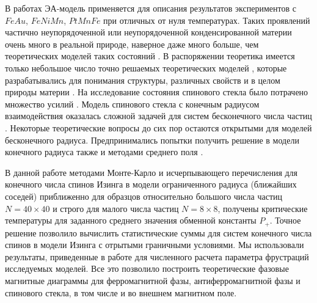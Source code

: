 В работах \cite{Feigelman1985Hierarchical, Murani1977Spin, Deryabin1983Features} ЭА-модель применяется для описания результатов экспериментов с $FeAu$, $FeNiMn$, $PtMnFe$ при отличных от нуля температурах.  Таких проявлений частично неупорядоченной или неупорядоченной конденсированной материи очень много в реальной природе, наверное даже много больше, чем теоретических моделей таких состояний \cite{ziman1979models}. В распоряжении теоретика имеется только небольшое число точно решаемых теоретических моделей \cite{baxter2016exactly}, которые разрабатывались для понимания структуры, различных свойств и в целом природы материи \cite{ziman1979models}. На исследование состояния спинового стекла было потрачено множество усилий \cite{binder1986spin, fischer1993spin, young1998spin, bezzub1983}. Модель спинового стекла с конечным радиусом взаимодействия оказалась сложной задачей для систем бесконечного числа частиц \cite{kor1989}. Некоторые теоретические вопросы до сих пор остаются открытыми для моделей бесконечного радиуса\cite{sherrington1975solvable}. Предпринимались попытки получить решение в модели конечного радиуса также и методами среднего поля \cite{belokon2006, belokon2001funk}. 

В данной работе методами Монте-Карло и исчерпывающего перечисления для конечного числа спинов Изинга в модели ограниченного радиуса (ближайших соседей) приближенно для образцов относительно большого числа частиц $N=40\times40$ и строго для малого числа частиц $N=8\times8$, получены критические температуры для заданного среднего значения обменной константы $P_+$. Точное решение позволило вычислить статистические суммы для систем конечного числа спинов в модели Изинга с отрытыми граничными условиями. Мы использовали результаты, приведенные в работе \cite{makarov2019} для численного расчета параметра фрустраций исследуемых моделей. Все это позволило построить теоретические фазовые магнитные диаграммы для ферромагнитной фазы, антиферромагнитной фазы и спинового стекла, в том числе и во внешнем магнитном поле.
